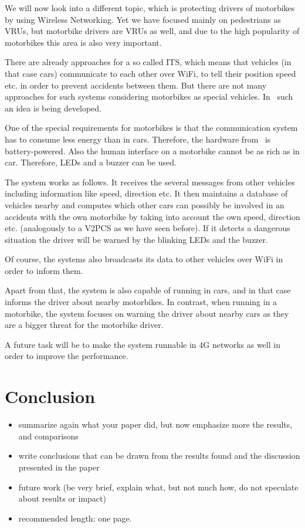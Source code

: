 \documentclass[]{ccs-thesis}
\begin{document}
We will now look into a different topic, which is protecting drivers of motorbikes by using Wireless Networking. Yet we have focused mainly on pedestrians as \acp{VRU}, but motorbike drivers are \acp{VRU} as well, and due to the high popularity of motorbikes this area is also very important. 

There are already approaches for a so called \ac{ITS}, which means that vehicles (in that case cars) communicate to each other over WiFi, to tell their position speed etc. in order to prevent accidents between them.  But there are not many approaches for such systems considering motorbikes as special vehicles. In~\cite{bikes} such an idea is being developed. 

One of the special requirements for motorbikes is that the communication system has to consume less energy than in cars. Therefore, the hardware from~\cite{bikes} is battery-powered. Also the human interface on a motorbike cannot be as rich as in car. Therefore, LEDs and a buzzer can be used.

The system works as follows. It receives the several messages from other vehicles including information like speed, direction etc. It then maintains a database of vehicles nearby and computes which other cars can possibly be involved in an accidents with the own motorbike by taking into account the own speed, direction etc. (analogously to a \ac{V2PCS} as we have seen before). If it detects a dangerous situation the driver will be warned by the blinking LEDs and the buzzer.

Of course, the systems also broadcasts its data to other vehicles over WiFi in order to inform them.

Apart from that, the system is also capable of running in cars, and in that case informs the driver about nearby motorbikes. In contrast, when running in a motorbike, the system focuses on warning the driver about nearby cars as they are a bigger threat for the motorbike driver.

A future task will be to make the system runnable in 4G networks as well in order to improve the performance.

\chapter{Conclusion}
\label{chap:conclusion}


\begin{itemize}
\item summarize again what your paper did, but now emphasize more the results, and comparisons
\item write conclusions that can be drawn from the results found and the discussion presented in the paper
\item future work (be very brief, explain what, but not much how, do not speculate about results or impact)
\item recommended length: one page.
\end{itemize}



\cleardoublepage

\clearpage

\listoffigures
\clearpage

\printbibliography
\end{document}
